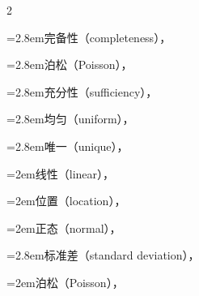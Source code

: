 \begin{multicols}{2}
\par\noindent\hangindent=2.8em\hspace*{1.8em}\label{idx:1048}完备性（completeness），\hyperref[thm:7.3.23]{\pageref*{thm:7.3.23}}\par
\par\noindent\hangindent=2.8em\hspace*{1.8em}\label{idx:1049}泊松（Poisson），\hyperref[ex:7.3.12]{\pageref*{ex:7.3.12}}\par
\par\noindent\hangindent=2.8em\hspace*{1.8em}\label{idx:1050}充分性（sufficiency），\hyperref[thm:7.3.17]{\pageref*{thm:7.3.17}}\par
\par\noindent\hangindent=2.8em\hspace*{1.8em}\label{idx:1051}均匀（uniform），\hyperref[ex:7.3.22]{\pageref*{ex:7.3.22}}\par
\par\noindent\hangindent=2.8em\hspace*{1.8em}\label{idx:1052}唯一（unique），\hyperref[thm:7.3.19]{\pageref*{thm:7.3.19}}\par
\par\noindent\hangindent=2em\hspace*{1em}\label{idx:1053}线性（linear），\hyperref[exercise:7.41]{\pageref*{exercise:7.41}}\par
\par\noindent\hangindent=2em\hspace*{1em}\label{idx:1054}位置（location），\hyperref[exercise:6.41]{\pageref*{exercise:6.41}}\par
\par\noindent\hangindent=2em\hspace*{1em}\label{idx:1055}正态（normal），\hyperref[ex:7.3.3]{\pageref*{ex:7.3.3}}\par
\par\noindent\hangindent=2.8em\hspace*{1.8em}\label{idx:1056}标准差（standard deviation），\hyperref[exercise:7.50]{\pageref*{exercise:7.50}}\par
\par\noindent\hangindent=2em\hspace*{1em}\label{idx:1057}泊松（Poisson），\hyperref[ex:7.3.8]{\pageref*{ex:7.3.8}}\par

\end{multicols}
